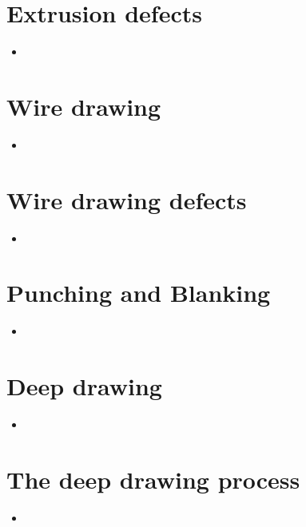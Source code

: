 \documentclass[8pt]{report}
\begin{document}
\section{Extrusion defects}
	\begin{itemize}
		\item
	\end{itemize}\hrulefill
\section{Wire drawing}
	\begin{itemize}
		\item
	\end{itemize}\hrulefill
\section{Wire drawing defects}
	\begin{itemize}
		\item
	\end{itemize}\hrulefill
\section{Punching and Blanking}
	\begin{itemize}
		\item
	\end{itemize}\hrulefill
\section{Deep drawing}
	\begin{itemize}
		\item
	\end{itemize}\hrulefill
\section{The deep drawing process}
	\begin{itemize}
		\item
	\end{itemize}\hrulefill
\end{document}
